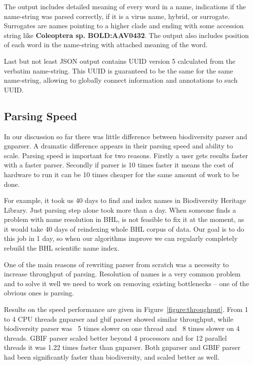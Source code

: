 \documentclass{bmcart}
\begin{document}
The output includes detailed meaning of every word in a name, indications if
the name-string was parsed correctly, if it is a virus name, hybrid, or
surrogate. Surrogates are names pointing to a higher clade and ending with
some accession string like \textbf{Coleoptera sp. BOLD:AAV0432}. The output
also includes position of each word in the name-string with attached meaning
of the word.

Last but not least JSON output contains UUID version 5 calculated from the
verbatim name-string. This UUID is guaranteed to be the same for the same
name-string, allowing to globally connect information and annotations to such
UUID.

\subsection*{Parsing Speed}

In our discussion so far there was little difference between biodiversity
parser and gnparser. A dramatic difference appears in their parsing speed and
ability to scale. Parsing speed is important for two reasons. Firstly a user
gets results faster with a faster parser. Secondly if parser is 10 times
faster it means the cost of hardware to run it can be 10 times cheaper for the
same amount of work to be done.

For example, it took us 40 days to find and index names in Biodiversity
Heritage Library. Just parsing step alone took more than a day. When someone
finds a problem with name resolution in BHL, is not feasible to fix it at the
moment, as it would take 40 days of reindexing whole BHL corpus of data. Our
goal is to do this job in 1 day, so when our algorithms improve we can
regularly completely rebuild the BHL scientific name index.

One of the main reasons of rewriting parser from scratch was a necessity to
increase throughput of parsing. Resolution of names is a very common problem
and to solve it well we need to work on removing existing bottlenecks -- one
of the obvious ones is parsing.

Results on the speed performance are given in Figure~\ref{figure:throughput}.
From 1 to 4 CPU threads gnparser and gbif parser showed similar throughput,
while biodiversity parser was ~5 times slower on one thread and ~8 times
slower on 4 threads. GBIF parser scaled better beyond 4 processors and for 12
parallel threads it was 1.22 times faster than gnparser. Both gnparser and
GBIF parser had been significantly faster than biodiversity, and scaled better
as well.
\end{document}
